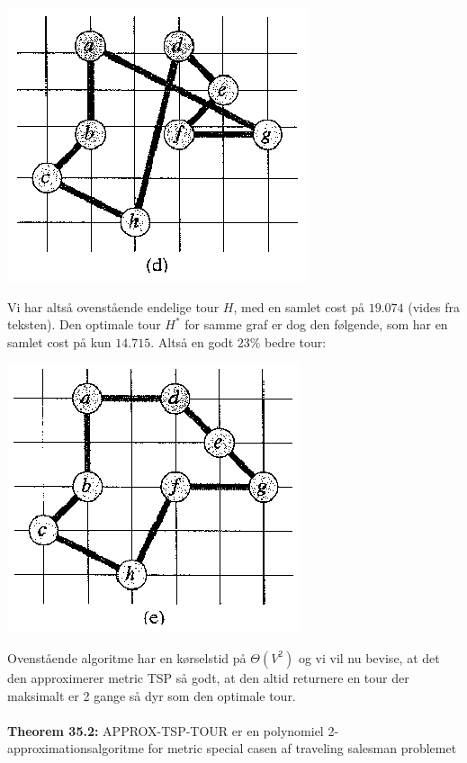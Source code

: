 \begin{center}
 \includegraphics[bb=0 0 247 226,scale=0.7]{./approxTSP4.png}
\end{center}
Vi har altså ovenstående endelige tour $H$, med en samlet cost på $19.074$ (vides fra teksten). Den optimale tour $H^*$ for samme graf er dog den følgende, som har en samlet cost på kun $14.715$. Altså en godt $23\%$ bedre tour:

\begin{center}
  \includegraphics[bb=0 0 247 226,scale=0.7]{./approxTSPOpt.png}
\end{center}

Ovenstående algoritme har en kørselstid på $\Theta(V^2)$ og vi vil nu bevise, at det den approximerer metric TSP så godt, at den altid returnere en tour der maksimalt er 2 gange så dyr som den optimale tour.\\
~\\
\textbf{Theorem 35.2:} APPROX-TSP-TOUR er en polynomiel 2-approximationsalgoritme for metric special casen af traveling salesman problemet

